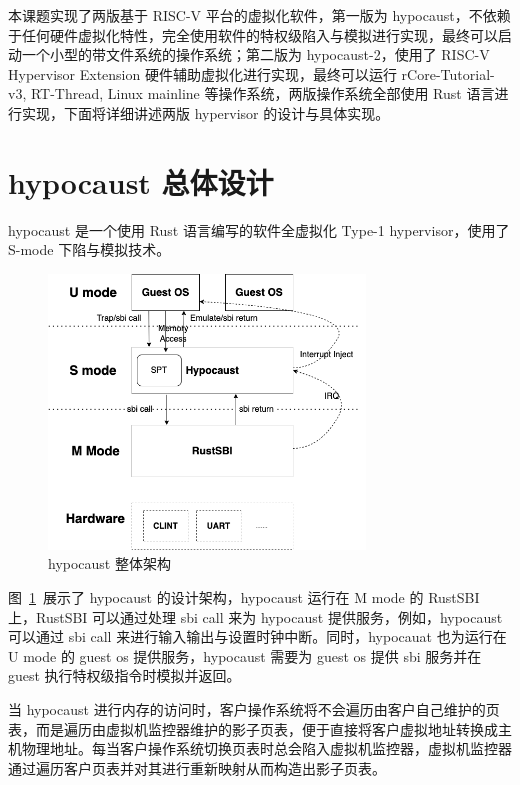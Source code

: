 本课题实现了两版基于 RISC-V 平台的虚拟化软件，第一版为 hypocaust，不依赖于任何硬件虚拟化特性，完全使用软件的特权级陷入与模拟进行实现，最终可以启动一个小型的带文件系统的操作系统；第二版为 hypocaust-2，使用了 RISC-V Hypervisor Extension 硬件辅助虚拟化进行实现，最终可以运行 rCore-Tutorial-v3, RT-Thread, Linux mainline 等操作系统，两版操作系统全部使用 Rust 语言进行实现，下面将详细讲述两版 hypervisor 的设计与具体实现。

\section{hypocaust 总体设计}
hypocaust 是一个使用 Rust 语言编写的软件全虚拟化 Type-1 hypervisor，使用了 S-mode 下陷与模拟技术。

\begin{figure}[]
    \centering
    \includegraphics[width=0.75\textwidth]{thesis-images/hypocaust-architecture.png}
    \caption{hypocaust 整体架构}\label{fig:hypocaust-arch}
\end{figure}

图~\ref{fig:hypocaust-arch}~展示了 hypocaust 的设计架构，hypocaust 运行在 M mode 的 RustSBI 上，RustSBI 可以通过处理 sbi call 来为 hypocaust 提供服务，例如，hypocaust 可以通过 sbi call 来进行输入输出与设置时钟中断。同时，hypocauat 也为运行在 U mode 的 guest os 提供服务，hypocaust 需要为 guest os 提供 sbi 服务并在 guest 执行特权级指令时模拟并返回。  

当 hypocaust 进行内存的访问时，客户操作系统将不会遍历由客户自己维护的页表，而是遍历由虚拟机监控器维护的影子页表，便于直接将客户虚拟地址转换成主机物理地址。每当客户操作系统切换页表时总会陷入虚拟机监控器，虚拟机监控器通过遍历客户页表并对其进行重新映射从而构造出影子页表。

